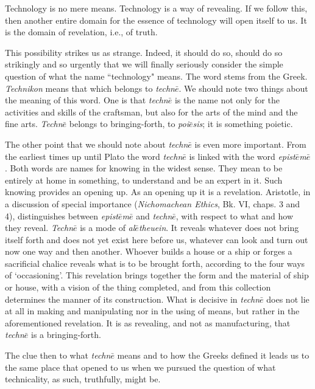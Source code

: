 \documentclass[paper=a4, fontsize=11pt,twoside]{scrartcl}
\begin{document}
Technology is no mere means. Technology is a way of revealing. If we follow this, then another entire domain for the essence of technology will open itself to us. It is the domain of revelation, i.e., of truth.

This possibility strikes us as strange. Indeed, it should do so, should do so strikingly and so urgently that we will finally seriously consider the simple question of what the name ``technology" means. The word stems from the Greek. \textit{Technikon} means that which belongs to \textit{techn$\bar{e}$}. We should note two things about the meaning of this word. One is that \textit{techn$\bar{e}$} is the name not only for the activities and skills of the craftsman, but also for the arts of the mind and the fine arts. \textit{Techn$\bar{e}$} belongs to bringing-forth, to \textit{poi$\bar{e}$sis}; it is something poietic.

The other point that we should note about \textit{techn$\bar{e}$} is even more important. From the earliest times up until Plato the word \textit{techn$\bar{e}$} is linked with the word \textit{epist$\bar{e}$m$\bar{e}$}. Both words are names for knowing in the widest sense. They mean to be entirely at home in something, to understand and be an expert in it. Such knowing provides an opening up. As an opening up it is a revelation. Aristotle, in a discussion of special importance (\textit{Nichomachean Ethics}, Bk. VI, chaps. 3 and 4), distinguishes between \textit{epist$\bar{e}$m$\bar{e}$} and \textit{techn$\bar{e}$}, with respect to what and how they reveal. \textit{Techn$\bar{e}$} is a mode of \textit{al$\bar{e}$theuein}. It reveals whatever does not bring itself forth and does not yet exist here before us, whatever can look and turn out now one way and then another. Whoever builds a house or a ship or forges a sacrificial chalice reveals what is to be brought forth, according to the four ways of `occasioning'. This revelation brings together the form and the material of ship or house, with a vision of the thing completed, and from this collection determines the manner of its construction. What is decisive in \textit{techn$\bar{e}$} does not lie at all in making and manipulating nor in the using of means, but rather in the aforementioned revelation. It is as revealing, and not as manufacturing, that \textit{techn$\bar{e}$} is a bringing-forth.

The clue then to what \textit{techn$\bar{e}$} means and to how the Greeks defined it leads us to the same place that opened to us when we pursued the question of what technicality, as such, truthfully, might be.
\end{document}
